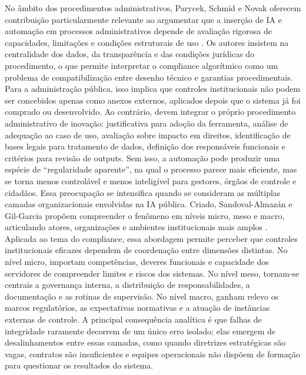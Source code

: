 \documentclass[12pt,a4paper]{article}
\begin{document}
No âmbito dos procedimentos administrativos, Parycek, Schmid e Novak oferecem contribuição particularmente relevante ao argumentar que a inserção de IA e automação em processos administrativos depende de avaliação rigorosa de capacidades, limitações e condições estruturais de uso \autocite{parycek2023artificial}. Os autores insistem na centralidade dos dados, da transparência e das condições jurídicas do procedimento, o que permite interpretar o compliance algorítmico como um problema de compatibilização entre desenho técnico e garantias procedimentais. Para a administração pública, isso implica que controles institucionais não podem ser concebidos apenas como anexos externos, aplicados depois que o sistema já foi comprado ou desenvolvido. Ao contrário, devem integrar o próprio procedimento administrativo de inovação: justificativa para adoção da ferramenta, análise de adequação ao caso de uso, avaliação sobre impacto em direitos, identificação de bases legais para tratamento de dados, definição dos responsáveis funcionais e critérios para revisão de outputs. Sem isso, a automação pode produzir uma espécie de “regularidade aparente”, na qual o processo parece mais eficiente, mas se torna menos controlável e menos inteligível para gestores, órgãos de controle e cidadãos.
Essa preocupação se intensifica quando se consideram as múltiplas camadas organizacionais envolvidas na IA pública. Criado, Sandoval-Almazán e Gil-Garcia propõem compreender o fenômeno em níveis micro, meso e macro, articulando atores, organizações e ambientes institucionais mais amplos \autocite{criado2024artificial}. Aplicada ao tema do compliance, essa abordagem permite perceber que controles institucionais eficazes dependem de coordenação entre dimensões distintas. No nível micro, importam competências, deveres funcionais e capacidade dos servidores de compreender limites e riscos dos sistemas. No nível meso, tornam-se centrais a governança interna, a distribuição de responsabilidades, a documentação e as rotinas de supervisão. No nível macro, ganham relevo os marcos regulatórios, as expectativas normativas e a atuação de instâncias externas de controle. A principal consequência analítica é que falhas de integridade raramente decorrem de um único erro isolado; elas emergem de desalinhamentos entre essas camadas, como quando diretrizes estratégicas são vagas, contratos são insuficientes e equipes operacionais não dispõem de formação para questionar os resultados do sistema.
\end{document}
